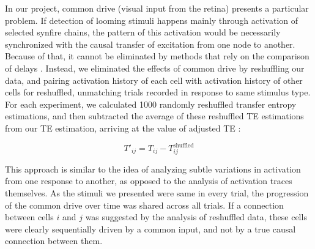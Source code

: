 \documentclass{article}
\begin{document}
In our project, common drive (visual input from the retina) presents a particular problem. If detection of looming stimuli happens mainly through activation of selected synfire chains, the pattern of this activation would be necessarily synchronized with the causal transfer of excitation from one node to another. Because of that, it cannot be eliminated by methods that rely on the comparison of delays \citep{wollstadt2014te}. Instead, we eliminated the effects of common drive by reshuffling our data, and pairing activation history of each cell with activation history of other cells for reshuffled, unmatching trials recorded in response to same stimulus type. For each experiment, we calculated 1000 randomly reshuffled transfer entropy estimations, and then subtracted the average of these reshuffled TE estimations from our TE estimation, arriving at the value of adjusted TE \citep{gourevitch2007te}:

\[ T'_{ij} = T_{ij} - T^\text{shuffled}_{ij} \]

This approach is similar to the idea of analyzing subtle variations in activation from one response to another, as opposed to the analysis of activation traces themselves. As the stimuli we presented were same in every trial, the progression of the common drive over time was shared across all trials. If a connection between cells $i$ and $j$ was suggested by the analysis of reshuffled data, these cells were clearly sequentially driven by a common input, and not by a true causal connection between them.
\end{document}
